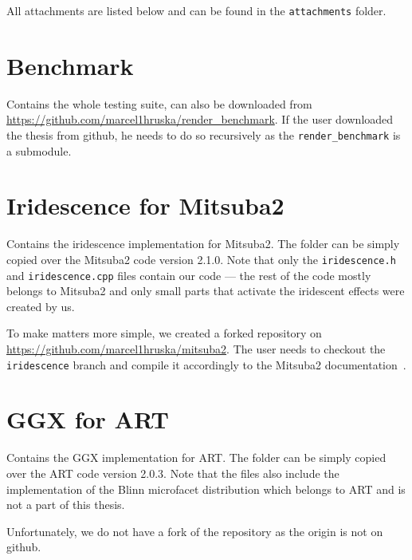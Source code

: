 \documentclass[12pt,a4paper]{report}
\let\openright=\clearpage
\begin{document}
All attachments are listed below and can be found in the \texttt{attachments} folder. 

\section{Benchmark}
\label{sec:benchmark}

Contains the whole testing suite, can also be downloaded from \url{https://github.com/marcel1hruska/render_benchmark}. If the user downloaded the thesis from github, he needs to do so recursively as the \texttt{render\_benchmark} is a submodule.

\section{Iridescence for Mitsuba2}
\label{sec:mitsuba2_irid}

Contains the iridescence implementation for Mitsuba2. The folder can be simply copied over the Mitsuba2 code version 2.1.0. Note that only the \texttt{iridescence.h} and \texttt{iridescence.cpp} files contain our code --- the rest of the code mostly belongs to Mitsuba2 and only small parts that activate the iridescent effects were created by us. 

To make matters more simple, we created a forked repository on \url{https://github.com/marcel1hruska/mitsuba2}. The user needs to checkout the \\ \texttt{iridescence} branch and compile it accordingly to the Mitsuba2 documentation~\cite{mitsubaWeb}.

\section{GGX for ART}
\label{sec:ggx_art}

Contains the GGX implementation for ART. The folder can be simply copied over the ART code version 2.0.3. Note that the files also include the implementation of the Blinn microfacet distribution which belongs to ART and is not a part of this thesis. 

Unfortunately, we do not have a fork of the repository as the origin is not on github.

\openright
\end{document}
